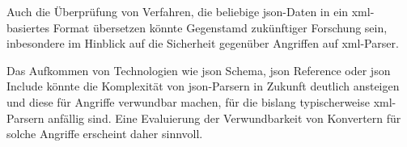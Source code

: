 Auch die Überprüfung von Verfahren, die beliebige \acrshort{json}-Daten in ein \acrshort{xml}-basiertes Format übersetzen könnte Gegenstamd zukünftiger Forschung sein, inbesondere im Hinblick auf die Sicherheit gegenüber Angriffen auf \acrshort{xml}-Parser.

Das Aufkommen von Technologien wie \acrshort{json} Schema, \acrshort{json} Reference oder \acrshort{json} Include könnte die Komplexität von \acrshort{json}-Parsern in Zukunft deutlich ansteigen und diese für Angriffe verwundbar machen, für die bislang typischerweise \acrshort{xml}-Parsern anfällig sind. Eine Evaluierung der Verwundbarkeit von Konvertern für solche Angriffe erscheint daher sinnvoll.
